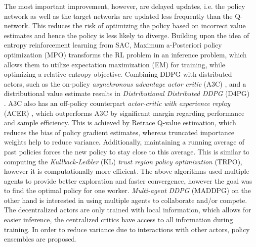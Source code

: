 	The most important improvement, however, are delayed updates, i.e. the policy network as well as the target networks are updated less frequently than the Q-network.
	This reduces the risk of optimizing the policy based on incorrect value estimates and hence the policy is less likely to diverge.	
	Building upon the idea of entropy reinforcement learning from SAC, Maximum a-Posteriori policy optimization (MPO) \cite{Abdolmaleki2018} transforms the RL problem in an inference problem, which allows them to utilize expectation maximization (EM) for training, while optimizing a relative-entropy objective.
	Combining DDPG with distributed actors, such as the on-policy \textit{asynchronous advantage actor critic} (A3C) \cite{Mnih2016}, and a distributional value estimate \cite{Bellemare2017} results in \textit{Distributional Distributed DDPG} (D4PG) \cite{Barth-Maron2018}.
	A3C also has an off-policy counterpart \textit{actor-critic with experience replay} (ACER) \cite{Wang2017}, which outperforms A3C by significant margin regarding performance and sample efficiency. 
	This is achieved by Retrace \cite{Munos2016} Q-value estimation, which reduces the bias of policy gradient estimates, whereas truncated importance weights help to reduce variance.
	Additionally, maintaining a running average of past policies forces the new policy to stay close to this average.
	This is similar to computing the \textit{Kullback-Leibler} (KL) \textit{trust region policy optimization} (TRPO), however it is computationally more efficient.
	The above algorithms used multiple agents to provide better exploration and faster convergence, however the goal was to find the optimal policy for one worker. 
	\textit{Multi-agent DDPG} (MADDPG) \cite{Lowe2017} on the other hand is interested in using multiple agents to collaborate and/or compete. 
	The decentralized actors are only trained with local information, which allows for easier inference, the centralized critics have access to all information during training. 
	In order to reduce variance due to interactions with other actors, policy ensembles are proposed. 
		
